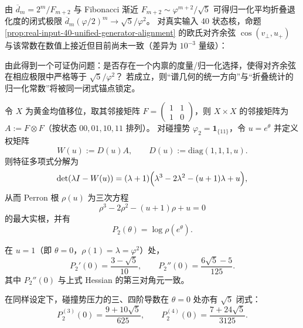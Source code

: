\begin{remark}\label{rem:alignment-cos-vs-sqrt5-phi2}
由 \(\overline d_m=2^m/F_{m+2}\) 与 Fibonacci 渐近 \(F_{m+2}\sim \varphi^{m+2}/\sqrt5\) 可得归一化平均折叠退化度的闭式极限
\(
\overline d_m(\varphi/2)^m\to \sqrt5/\varphi^2
\)。
对真实输入 40 状态核，命题 \ref{prop:real-input-40-unified-generator-alignment} 的欧氏对齐余弦
\(\cos(v_\perp,u_+)\) 与该常数在数值上接近但目前尚未一致（差异为 \(10^{-3}\) 量级）：

由此得到一个可证伪问题：是否存在一个内禀的度量/归一化选择，使得对齐余弦在相应极限中严格等于 \(\sqrt5/\varphi^2\)？
若成立，则“谱几何的统一方向”与“折叠统计的归一化常数”将被同一闭式锚点锁定。
\end{remark}

\begin{proposition}[碰撞势的三次压力方程]\label{prop:real-input-40-collision-pressure}
令 $X$ 为黄金均值移位，取其邻接矩阵
\(
F=\begin{pmatrix}1&1\\[2pt]1&0\end{pmatrix}
\)，则 $X\times X$ 的邻接矩阵为 $A:=F\otimes F$（按状态 $00,01,10,11$ 排列）。
对碰撞势 $\varphi_2=\mathbf{1}_{\{11\}}$，令 $u=e^\theta$ 并定义权矩阵
\[
W(u):=D(u)A,\qquad D(u):=\mathrm{diag}(1,1,1,u).
\]
则特征多项式分解为
\[
\det(\lambda I-W(u))=(\lambda+1)\Bigl(\lambda^3-2\lambda^2-(u+1)\lambda+u\Bigr),
\]
从而 Perron 根 $\rho(u)$ 为三次方程
\[
\rho^3-2\rho^2-(u+1)\rho+u=0
\]
的最大实根，并有
\[
P_2(\theta)=\log\rho(e^\theta).
\]
\end{proposition}

\begin{corollary}\label{cor:real-input-40-collision-cumulants}
在 $u=1$（即 $\theta=0$，$\rho(1)=\lambda=\varphi^2$）处，
\[
P_2'(0)=\frac{3-\sqrt5}{10},
\qquad
P_2''(0)=\frac{6\sqrt5-5}{125}.
\]
其中 $P_2''(0)$ 与上式 Hessian 的第三对角元一致。
\end{corollary}

\begin{corollary}[三、四阶累积量闭式]\label{cor:real-input-40-collision-cumulants-higher}
在同样设定下，碰撞势压力的三、四阶导数在 $\theta=0$ 处亦有 $\sqrt5$ 闭式：
\[
\boxed{\;
P_2^{(3)}(0)=\frac{9+10\sqrt5}{625},
\qquad
P_2^{(4)}(0)=\frac{7+24\sqrt5}{3125}.
\;}
\]
\end{corollary}

